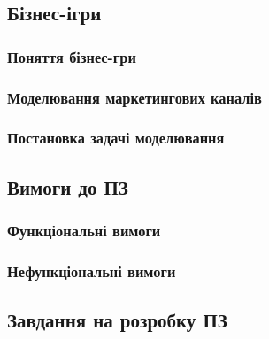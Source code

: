 \subsection{Бізнес-ігри}
\subsubsection{Поняття бізнес-гри}
\subsubsection{Моделювання маркетингових каналів}
\subsubsection{Постановка задачі моделювання}

\subsection{Вимоги до ПЗ}
\subsubsection{Функціональні вимоги}

\subsubsection{Нефункціональні вимоги}
\subsection{Завдання на розробку ПЗ}